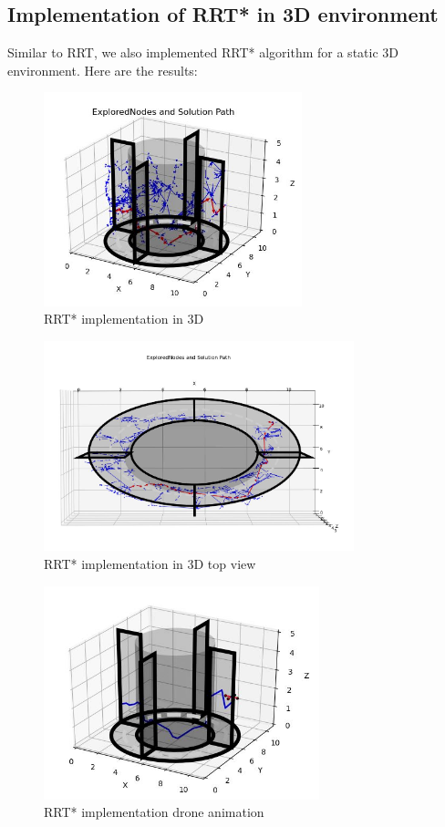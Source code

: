 \documentclass{IEEEtran}
\begin{document}
\subsection{\textbf{Implementation of RRT* in 3D environment}}
Similar to RRT, we also implemented RRT* algorithm for a static 3D environment. Here are the results:
\begin{figure}[h]
    \includegraphics[width=7.5cm]{rrtstar3d}
    \caption{RRT* implementation in 3D}
    \label{fig:RRT* implementation in 3D}
\end{figure} 
\newpage
\begin{figure}[h]
    \centering
    \includegraphics[width=9cm]{rrtstar3dtop}
    \caption{RRT* implementation in 3D top view}
    \label{fig:RRT* implementation in 3D top view}
\end{figure}
 \begin{figure}[h]
    \centering
    \includegraphics[width=8cm]{rrtstar3ddrone}
    \caption{RRT* implementation drone animation}
    \label{fig:RRT* implementation drone animation}
\end{figure}
\end{document}
